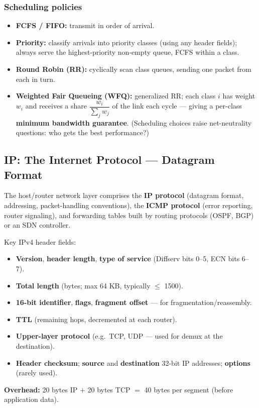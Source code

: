 \documentclass[hidelinks]{article}
\begin{document}
\subsubsection{Scheduling policies}
\begin{itemize}
    \item \textbf{FCFS / FIFO:} transmit in order of arrival.
    \item \textbf{Priority:} classify arrivals into priority classes (using
    any header fields); always serve the highest-priority non-empty queue,
    FCFS within a class.
    \item \textbf{Round Robin (RR):} cyclically scan class queues, sending one
    packet from each in turn.
    \item \textbf{Weighted Fair Queueing (WFQ):} generalized RR; each class
    $i$ has weight $w_i$ and receives a share
    $\dfrac{w_i}{\sum_j w_j}$ of the link each cycle --- giving a per-class
    \textbf{minimum bandwidth guarantee}. (Scheduling choices raise
    net-neutrality questions: who gets the best performance?)
\end{itemize}

\subsection{IP: The Internet Protocol --- Datagram Format}

The host/router network layer comprises the \textbf{IP protocol}
(datagram format, addressing, packet-handling conventions), the
\textbf{ICMP protocol} (error reporting, router signaling), and forwarding
tables built by routing protocols (OSPF, BGP) or an SDN controller.

Key IPv4 header fields:
\begin{itemize}
    \item \textbf{Version}, \textbf{header length}, \textbf{type of service}
    (Diffserv bits 0--5, ECN bits 6--7).
    \item \textbf{Total length} (bytes; max 64 KB, typically $\leq$ 1500).
    \item \textbf{16-bit identifier}, \textbf{flags}, \textbf{fragment
    offset} --- for fragmentation/reassembly.
    \item \textbf{TTL} (remaining hops, decremented at each router).
    \item \textbf{Upper-layer protocol} (e.g.\ TCP, UDP --- used for demux at
    the destination).
    \item \textbf{Header checksum}; \textbf{source} and \textbf{destination}
    32-bit IP addresses; \textbf{options} (rarely used).
\end{itemize}
\textbf{Overhead:} 20 bytes IP $+$ 20 bytes TCP $=$ 40 bytes per segment
(before application data).
\end{document}
